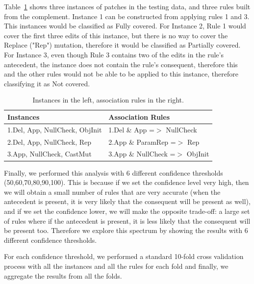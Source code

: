 \documentclass[conference]{IEEEtran}
\begin{document}
Table~\ref{rulesandinstances} shows three instances of patches in the testing data, and three rules built from the complement. Instance 1 can be constructed from applying rules 1 and 3. This instances would be classified as Fully covered. For Instance 2, Rule 1 would cover the first three edits of this instance, but there is no way to cover the Replace ("Rep") mutation, therefore it would be classified as Partially covered. For Instance 3, even though Rule 3 contains two of the edits in the rule's antecedent, the instance does not contain the rule's consequent, therefore this and the other rules would not be able to be applied to this instance, therefore classifying it as Not covered.

\begin{table}[ht]
  \centering
{\small
\begin{tabular}{|l|l|}
\toprule
Instances & Association Rules \\
\midrule
1.Del, App, NullCheck, ObjInit & 1.Del \& App =$>$ NullCheck \\ 
2.Del, App, NullCheck, Rep  & 2.App \& ParamRep =$>$ Rep \\  
3.App, NullCheck, CastMut & 3.App \& NullCheck =$>$ ObjInit\\
\bottomrule

\end{tabular}
  \caption{Instances in the left, association rules in the right. \label{rulesandinstances}}
}
\end{table}

Finally, we performed this analysis with 6 different confidence thresholds (50,60,70,80,90,100). This is because if we set the confidence level very high, then we will obtain a small number of rules that are very accurate (when the antecedent is present, it is very likely that the consequent will be present as well), and if we set the confidence lower, we will make the opposite trade-off: a large set of rules where if the antecedent is present, it is less likely that the consequent will be present too. Therefore we explore this spectrum by showing the results with 6 different confidence thresholds. 

For each confidence threshold, we performed a standard 10-fold cross validation process with all the instances and all the rules for each fold and finally, we aggregate the results from all the folds.
\end{document}
